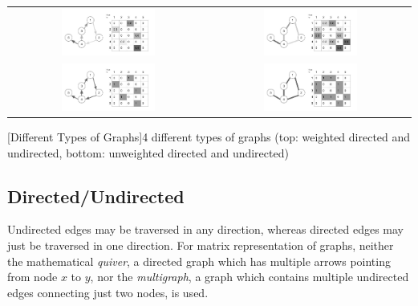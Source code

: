 \begin{table}[tp]
  \centering
\begin{tabu}{cc}
	\includegraphics[width=0.49\textwidth]{images/directed_weighted_graph}
	 &
	\includegraphics[width=0.49\textwidth]{images/undirected_weighted_graph} \\
	\includegraphics[width=0.49\textwidth]{images/directed_graph}  &
	\includegraphics[width=0.49\textwidth]{images/undirected_graph} 
\end{tabu}
[Different Types of Graphs]{4 different types of graphs (top: weighted directed and undirected, bottom: unweighted directed and undirected)\label{fig:graph_types}}
\end{table}


\subsection{Directed/Undirected}

Undirected edges may be traversed in any direction, whereas directed edges may just be traversed in one direction. For matrix representation of graphs, neither the mathematical \textit{quiver}, a directed graph which has multiple arrows pointing from node $x$ to $y$, nor the \textit{multigraph}, a graph which contains multiple undirected edges connecting just two nodes, is used.


